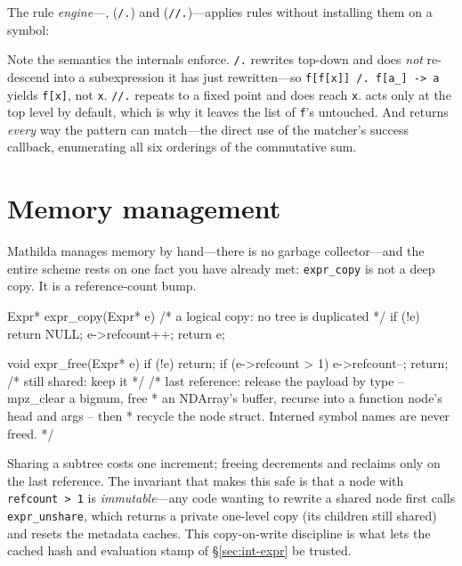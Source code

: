 The rule \emph{engine}---,  (\texttt{/.}) and
 (\texttt{//.})---applies rules without installing them on a symbol:


Note the semantics the internals enforce. \texttt{/.} rewrites top-down and does
\emph{not} re-descend into a subexpression it has just rewritten---so
\texttt{f[f[x]] /. f[a\_] -> a} yields \texttt{f[x]}, not \texttt{x}. \texttt{//.}
repeats to a fixed point and does reach \texttt{x}.  acts only at the top
level by default, which is why it leaves the list of \texttt{f}'s untouched. And
 returns \emph{every} way the pattern can match---the direct use of the
matcher's success callback, enumerating all six orderings of the commutative sum.

\section{Memory management}
\label{sec:int-memory}

Mathilda manages memory by hand---there is no garbage collector---and the entire
scheme rests on one fact you have already met: \texttt{expr\_copy} is not a deep copy.
It is a reference-count bump.

\begin{ccode}
Expr* expr_copy(Expr* e) {          /* a logical copy: no tree is duplicated */
    if (!e) return NULL;
    e->refcount++;
    return e;
}

void expr_free(Expr* e) {
    if (!e) return;
    if (e->refcount > 1) { e->refcount--; return; }  /* still shared: keep it */
    /* last reference: release the payload by type -- mpz_clear a bignum, free
     * an NDArray's buffer, recurse into a function node's head and args -- then
     * recycle the node struct. Interned symbol names are never freed. */
}
\end{ccode}

Sharing a subtree costs one increment; freeing decrements and reclaims only on the
last reference. The invariant that makes this safe is that a node with
\texttt{refcount > 1} is \emph{immutable}---any code wanting to rewrite a shared node
first calls \texttt{expr\_unshare}, which returns a private one-level copy (its
children still shared) and resets the metadata caches. This copy-on-write discipline
is what lets the cached hash and evaluation stamp of \S\ref{sec:int-expr} be trusted.

